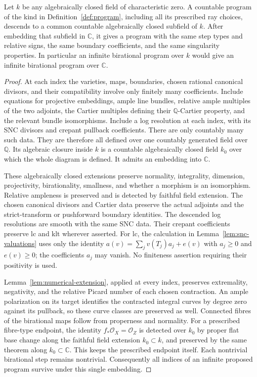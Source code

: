 \begin{proposition}\label{prop:field-transfer}
Let $k$ be any algebraically closed field of characteristic
zero.  A countable program of the kind in
Definition~\ref{def:program}, including all its prescribed ray
choices, descends to a common countable algebraically closed
subfield of $k$.  After embedding that subfield in $\mathbb C$,
it gives a program with the same step types and relative signs,
the same boundary coefficients, and the same singularity
properties.  In particular an infinite birational program
over $k$ would give an infinite birational program over
$\mathbb C$.
\end{proposition}

\begin{proof}
At each index the varieties, maps, boundaries, chosen rational
canonical divisors, and their compatibility involve only
finitely many coefficients.  Include equations for projective
embeddings, ample line bundles, relative ample multiples of
the two adjoints, the Cartier multiples defining their
$\mathbb Q$-Cartier property, and the relevant bundle
isomorphisms.  Include a log resolution at each index, with
its SNC divisors and crepant pullback coefficients.  There are
only countably many such data.  They are therefore all defined
over one countably generated field over $\mathbb Q$.
Its algebraic closure inside $k$ is a countable algebraically
closed field $k_0$ over which the whole diagram is defined.
It admits an embedding into $\mathbb C$.

These algebraically closed extensions preserve normality,
integrality, dimension, projectivity, birationality, smallness,
and whether a morphism is an isomorphism.  Relative ampleness
is preserved and is detected by faithful field extension.
The chosen canonical divisors and Cartier data preserve the
actual adjoints and the strict-transform or pushforward
boundary identities.  The descended log resolutions are
smooth with the same SNC data.  Their crepant coefficients
preserve lc and klt wherever asserted.  For lc, the calculation
in Lemma~\ref{lem:snc-valuations} uses only the identity
$a(v)=\sum_jv(T_j)a_j+e(v)$ with $a_j\geq0$ and $e(v)\geq0$;
the coefficients $a_j$ may vanish.  No finiteness assertion
requiring their positivity is used.

Lemma~\ref{lem:numerical-extension}, applied at every index,
preserves extremality, negativity, and the relative Picard
number of each chosen contraction.  An ample polarization on
its target identifies the contracted integral curves by degree
zero against its pullback, so these curve classes are preserved
as well.  Connected fibres of the birational maps follow from
properness and normality.  For a prescribed fibre-type endpoint,
the identity $f_*\mathcal O_X=\mathcal O_Z$ is detected over $k_0$
by proper flat base change along the faithful field extension
$k_0\subset k$, and preserved by the same theorem along
$k_0\subset\mathbb C$.  This keeps the prescribed endpoint
itself.  Each nontrivial birational step remains nontrivial.
Consequently all indices of an infinite proposed program
survive under this single embedding.


\end{proof}
